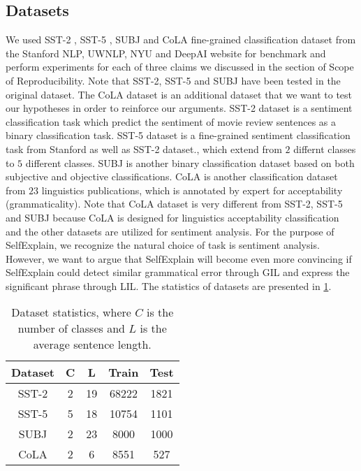 \documentclass{article}
\begin{document}
\subsection{Datasets}

We used SST-2 \cite{socher-etal-2013-recursive}, SST-5 \cite{socher-etal-2013-recursive}, 
SUBJ \cite{pang-lee-2005-seeing} and CoLA \cite{warstadt2018neural} fine-grained classification dataset from the Stanford NLP, UWNLP, NYU and DeepAI website for 
benchmark and perform experiments for each of three claims we discussed in the section of 
Scope of Reproducibility. Note that SST-2, SST-5 and SUBJ have been tested in the original 
dataset. The CoLA dataset is an additional dataset that we want to test our hypotheses in order to 
reinforce our arguments. SST-2 dataset is a sentiment classification task which predict 
the sentiment of movie review sentences as a binary classification task. SST-5 dataset is a fine-grained 
sentiment classification task from Stanford as well as SST-2 dataset., which extend from $2$ differnt 
classes to $5$ different classes. SUBJ is another binary classification dataset based on both 
subjective and objective classifications. CoLA is another classification dataset from $23$ 
linguistics publications, which is annotated by expert for acceptability (grammaticality). Note that 
CoLA dataset is very different from SST-2, SST-5 and SUBJ because CoLA is designed for linguistics 
acceptability classification and the other datasets are utilized for sentiment analysis. For the purpose 
of SelfExplain, we recognize the natural choice of task is sentiment analysis. However, we want to argue 
that SelfExplain will become even more convincing if SelfExplain could detect similar grammatical error
 through GIL and express the significant phrase through LIL. The statistics of datasets are presented 
 in \ref{table:1}.

\begin{table}[h!]
  \centering
  \begin{tabular}{||c c c c c||} 
   \hline
   Dataset & C & L & Train & Test  \\ [0.5ex] 
   \hline\hline
   SST-2 & 2 & 19 & 68222 & 1821 \\
   SST-5 & 5 & 18 & 10754 & 1101 \\ 
   SUBJ  & 2 & 23 &  8000 & 1000 \\
   CoLA  & 2 &  6 &  8551 &  527 \\
   \hline
  \end{tabular} \\ [1ex]
  \caption{Dataset statistics, where $C$ is the number of classes and $L$ is the 
  average sentence length.}
  \label{table:1}
\end{table}
\end{document}
